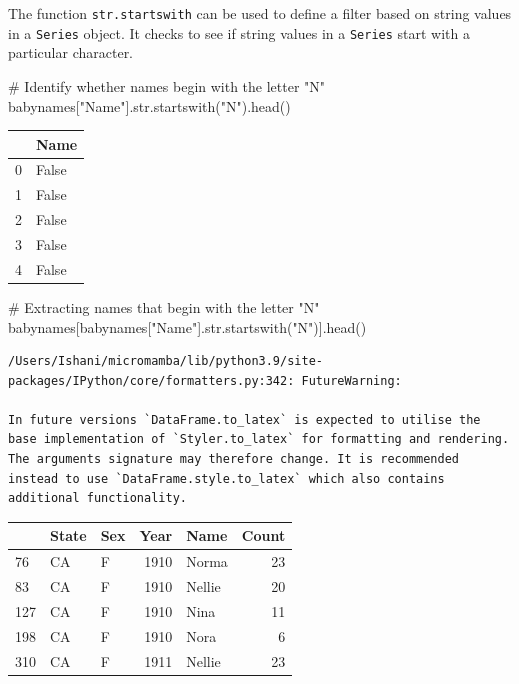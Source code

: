 \documentclass[
  letterpaper,
  DIV=11,
  numbers=noendperiod]{scrreprt}
\newenvironment{Shaded}{\begin{snugshade}}{\end{snugshade}}
\newcommand{\BuiltInTok}[1]{\textcolor[rgb]{0.00,0.23,0.31}{#1}}
\newcommand{\CommentTok}[1]{\textcolor[rgb]{0.37,0.37,0.37}{#1}}
\newcommand{\NormalTok}[1]{\textcolor[rgb]{0.00,0.23,0.31}{#1}}
\newcommand{\StringTok}[1]{\textcolor[rgb]{0.13,0.47,0.30}{#1}}
\begin{document}
The function \texttt{str.startswith} can be used to define a filter
based on string values in a \texttt{Series} object. It checks to see if
string values in a \texttt{Series} start with a particular character.

\begin{Shaded}
\begin{Highlighting}[]
\CommentTok{\# Identify whether names begin with the letter "N"}
\NormalTok{babynames[}\StringTok{"Name"}\NormalTok{].}\BuiltInTok{str}\NormalTok{.startswith(}\StringTok{"N"}\NormalTok{).head()}
\end{Highlighting}
\end{Shaded}

\begin{tabular}{ll}
\toprule
{} &   Name \\
\midrule
0 &  False \\
1 &  False \\
2 &  False \\
3 &  False \\
4 &  False \\
\bottomrule
\end{tabular}

\begin{Shaded}
\begin{Highlighting}[]
\CommentTok{\# Extracting names that begin with the letter "N"}
\NormalTok{babynames[babynames[}\StringTok{"Name"}\NormalTok{].}\BuiltInTok{str}\NormalTok{.startswith(}\StringTok{"N"}\NormalTok{)].head()}
\end{Highlighting}
\end{Shaded}

\begin{verbatim}
/Users/Ishani/micromamba/lib/python3.9/site-packages/IPython/core/formatters.py:342: FutureWarning:

In future versions `DataFrame.to_latex` is expected to utilise the base implementation of `Styler.to_latex` for formatting and rendering. The arguments signature may therefore change. It is recommended instead to use `DataFrame.style.to_latex` which also contains additional functionality.
\end{verbatim}

\begin{tabular}{lllrlr}
\toprule
{} & State & Sex &  Year &    Name &  Count \\
\midrule
76  &    CA &   F &  1910 &   Norma &     23 \\
83  &    CA &   F &  1910 &  Nellie &     20 \\
127 &    CA &   F &  1910 &    Nina &     11 \\
198 &    CA &   F &  1910 &    Nora &      6 \\
310 &    CA &   F &  1911 &  Nellie &     23 \\
\bottomrule
\end{tabular}
\end{document}
